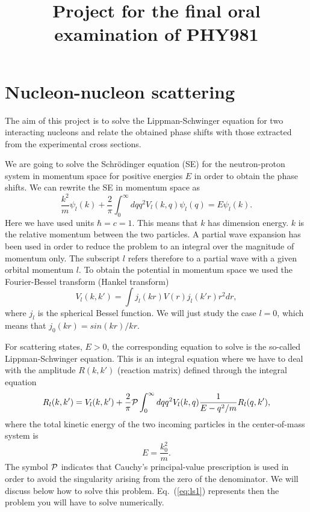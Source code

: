 \documentclass[prc]{revtex4}
\begin{document}
\title{Project for the final oral examination of PHY981}
\maketitle
\section*{Nucleon-nucleon scattering}

The aim of this project is to solve the Lippman-Schwinger equation for two interacting nucleons and relate the obtained phase shifts with those extracted from the experimental cross sections.

We are going to solve the Schr\"odinger equation (SE) 
for the neutron-proton system 
in momentum space for positive energies $E$ in order to obtain
the phase shifts. 
We can rewrite the SE 
in momentum space as
\begin{equation}
     \frac{k^2}{m}\psi_l(k)+\frac{2}{\pi}\int_0^{\infty}dqq^2V_l(k,q)\psi_l(q)=E\psi_l(k).
     \label{eq:sem}
\end{equation}
Here we have used units $\hbar=c=1$. This means that $k$ has dimension energy. 
$k$ is the relative momentum between the two particles. A partial
wave expansion has been used in order to reduce the problem to an integral
over the magnitude of momentum only. The subscript $l$ refers therefore to a partial wave with a given orbital momentum $l$.
To obtain the potential in momentum space we used 
the Fourier-Bessel transform (Hankel transform)
\begin{equation}
      V_l(k,k')= \int j_l(kr)V(r)j_l(k'r)r^2dr,
      \label{eq:vtrans}
\end{equation}
where $j_l$ is the spherical Bessel function. 
We will just study the case
$l=0$, which means that $j_0(kr)=sin(kr)/kr$. 

For scattering states, $E>0$, the corresponding equation to solve is 
the so-called Lippman-Schwinger equation. This is an integral equation
where we have to deal with the amplitude $R(k,k')$ (reaction matrix) 
defined through the integral equation 
\begin{equation}
    R_l(k,k') = V_l(k,k') +\frac{2}{\pi}{\cal P}
                \int_0^{\infty}dqq^2V_l(k,q)\frac{1}{E-q^2/m}R_l(q,k'),
   \label{eq:ls1}
\end{equation}
where the total kinetic energy of the two 
incoming particles in the center-of-mass system
is 
\begin{equation}
    E=\frac{k_0^2}{m}.
\end{equation}
The symbol ${\cal P}$ indicates that Cauchy's principal-value prescription
is used in order to avoid the singularity arising from the zero of the denominator.
We will discuss below how to solve this problem. Eq.\ (\ref{eq:ls1}) represents
then the problem you will have to solve numerically.
\end{document}
